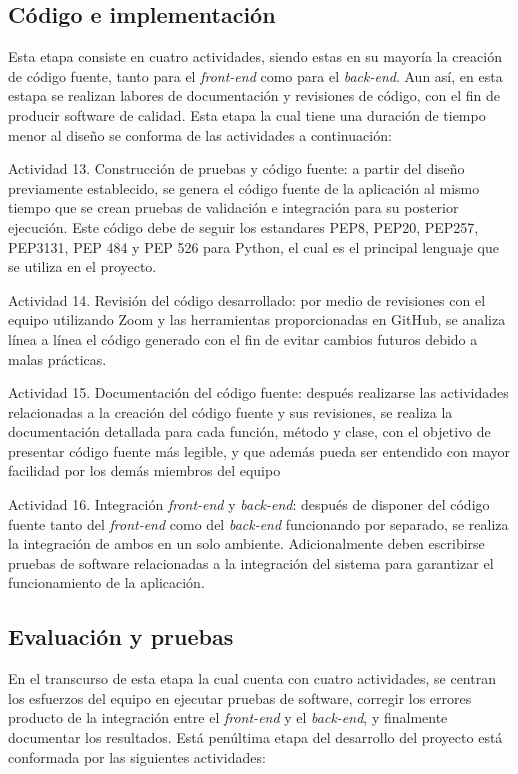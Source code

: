 \subsection{Código e implementación}
Esta etapa consiste en cuatro actividades, siendo estas en su mayoría la creación de código fuente, tanto para el \textit{front-end} como para el \textit{back-end}. Aun así, en esta estapa se realizan labores de documentación y revisiones de código, con el fin de producir software de calidad. Esta etapa la cual tiene una duración de tiempo menor al diseño se conforma de las actividades a continuación:

\begin{APAitemize}
    \item Actividad 13. Construcción de pruebas y código fuente: a partir del diseño previamente establecido, se genera el código fuente de la aplicación al mismo tiempo que se crean pruebas de validación e integración para su posterior ejecución. Este código debe de seguir los estandares PEP8, PEP20, PEP257, PEP3131, PEP 484 y PEP 526 para Python, el cual es el principal lenguaje que se utiliza en el proyecto.
    \item Actividad 14. Revisión del código desarrollado: por medio de revisiones con el equipo utilizando Zoom y las herramientas proporcionadas en GitHub, se analiza línea a línea el código generado con el fin de evitar cambios futuros debido a malas prácticas.
    \item Actividad 15. Documentación del código fuente: después realizarse las actividades relacionadas a la creación del código fuente y sus revisiones, se realiza la documentación detallada para cada función, método y clase, con el objetivo de presentar código fuente más legible, y que además pueda ser entendido con mayor facilidad por los demás miembros del equipo
    \item Actividad 16. Integración \textit{front-end} y \textit{back-end}: después de disponer del código fuente tanto del \textit{front-end} como del \textit{back-end} funcionando por separado, se realiza la integración de ambos en un solo ambiente. Adicionalmente deben escribirse pruebas de software relacionadas a la integración del sistema para garantizar el funcionamiento de la aplicación.
\end{APAitemize}

\subsection{Evaluación y pruebas}
En el transcurso de esta etapa la cual cuenta con cuatro actividades, se centran los esfuerzos del equipo en ejecutar pruebas de software, corregir los errores producto de la integración entre el \textit{front-end} y el \textit{back-end}, y finalmente documentar los resultados. Está penúltima etapa del desarrollo del proyecto está conformada por las siguientes actividades:


